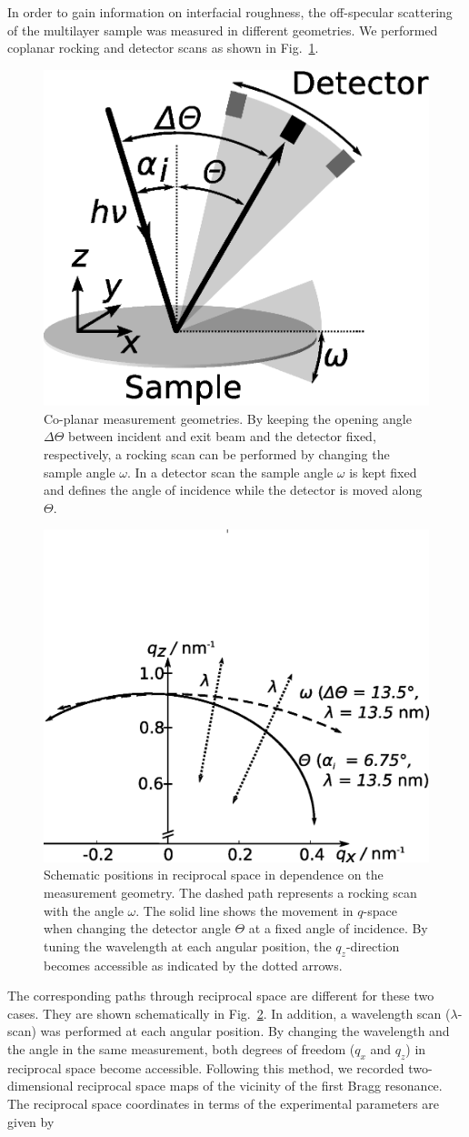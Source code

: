 In order to gain information on interfacial roughness, the off-specular scattering of the multilayer sample was measured in different geometries. We performed coplanar rocking and detector scans as shown in Fig.~\ref{fig:measurementGeometry}.
\begin{figure}
        \includegraphics[width=0.3
        \textwidth]{img/im_mo_si/Streugeometrie} \caption{Co-planar measurement geometries. By keeping the opening angle $\Delta\Theta$ between incident and exit beam and the detector fixed, respectively, a rocking scan can be performed by changing the sample angle $\omega$. In a detector scan the sample angle $\omega$ is kept fixed and defines the angle of incidence while the detector is moved along $\Theta$.} \label{fig:measurementGeometry} 
\end{figure}
\begin{figure}
        \includegraphics[width=0.45
        \textwidth]{img/im_mo_si/Qspace_paths} \caption{Schematic positions in reciprocal space in dependence on the measurement geometry. The dashed path represents a rocking scan with the angle $\omega$. The solid line shows the movement in $q$-space when changing the detector angle $\Theta$ at a fixed angle of incidence. By tuning the wavelength at each angular position, the $q_z$-direction becomes accessible as indicated by the dotted arrows.} \label{fig:pathsInQ} 
\end{figure}
The corresponding paths through reciprocal space are different for these two cases. They are shown schematically in Fig.~\ref{fig:pathsInQ}. In addition, a wavelength scan ($\lambda$-scan) was performed at each angular position. By changing the wavelength and the angle in the same measurement, both degrees of freedom ($q_x$ and $q_z$) in reciprocal space become accessible. Following this method, we recorded two-dimensional reciprocal space maps of the vicinity of the first Bragg resonance. The reciprocal space coordinates in terms of the experimental parameters are given by 
